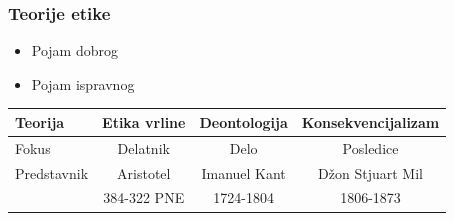 \documentclass[pdf]{beamer}
\begin{document}
\begin{frame}
\frametitle{Teorije etike}

\begin{itemize}
\item{Pojam dobrog}
\item{Pojam ispravnog}
\end{itemize}


\begin{table}
\begin{center}
\begin{tabular}{|l|c|c|c|} \hline
Teorija & Etika vrline & Deontologija & Konsekvencijalizam\\ \hline
Fokus & Delatnik & Delo & Posledice\\ \hline
Predstavnik & Aristotel & Imanuel Kant & Džon Stjuart Mil\\
& 384-322 PNE & 1724-1804 & 1806-1873\\ 

\end{tabular}
\end{center}
\end{table}
\end{frame}
\end{document}
